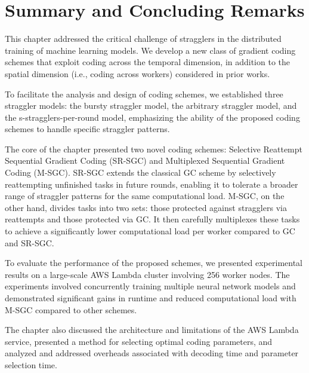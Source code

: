\FloatBarrier

\section{Summary and Concluding Remarks}
 
This chapter addressed the critical challenge of stragglers in the distributed training of machine learning models. We develop a new class of gradient coding schemes that exploit coding across the temporal dimension, in addition to the spatial dimension (i.e., coding across workers) considered in prior works.

To facilitate the analysis and design of coding schemes, we established three straggler models: the bursty straggler model, the arbitrary straggler model, and the s-stragglers-per-round model, emphasizing the ability of the proposed coding schemes to handle specific straggler patterns.

The core of the chapter presented two novel coding schemes: Selective Reattempt Sequential Gradient Coding (SR-SGC) and Multiplexed Sequential Gradient Coding (M-SGC). SR-SGC extends the classical GC scheme by selectively reattempting unfinished tasks in future rounds, enabling it to tolerate a broader range of straggler patterns for the same computational load. M-SGC, on the other hand, divides tasks into two sets: those protected against stragglers via reattempts and those protected via GC. It then carefully multiplexes these tasks to achieve a significantly lower computational load per worker compared to GC and SR-SGC.

To evaluate the performance of the proposed schemes, we presented experimental results on a large-scale AWS Lambda cluster involving 256 worker nodes. The experiments involved concurrently training multiple neural network models and demonstrated significant gains in runtime and reduced computational load with M-SGC compared to other schemes.

The chapter also discussed the architecture and limitations of the AWS Lambda service, presented a method for selecting optimal coding parameters, and analyzed and addressed overheads associated with decoding time and parameter selection time.






